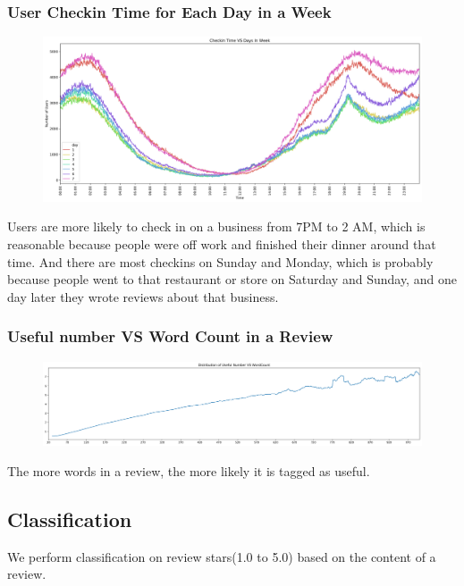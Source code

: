\documentclass[12pt]{article}
\begin{document}
\subsubsection{User Checkin Time for Each Day in a Week}
\begin{figure}[H]
\begin{center}
    \includegraphics[width=1.0\textwidth]{../05_dataMining/checkinTimeVSDay.png}
\end{center}
\end{figure}
Users are more likely to check in on a business from 7PM to 2 AM, which is reasonable because people were off work and finished their dinner around that time. And there are most checkins on Sunday and Monday, which is probably because people went to that restaurant or store on Saturday and Sunday, and one day later they wrote reviews about that business.

\subsubsection{Useful number VS Word Count in a Review}
\begin{figure}[H]
\begin{center}
    \includegraphics[width=1.0\textwidth]{../05_dataMining/distributionUsefulWordCount.png}
\end{center}
\end{figure}
The more words in a review, the more likely it is tagged as useful.
\subsection{Classification}
We perform classification on review stars(1.0 to 5.0) based on the content of a review.
\end{document}
